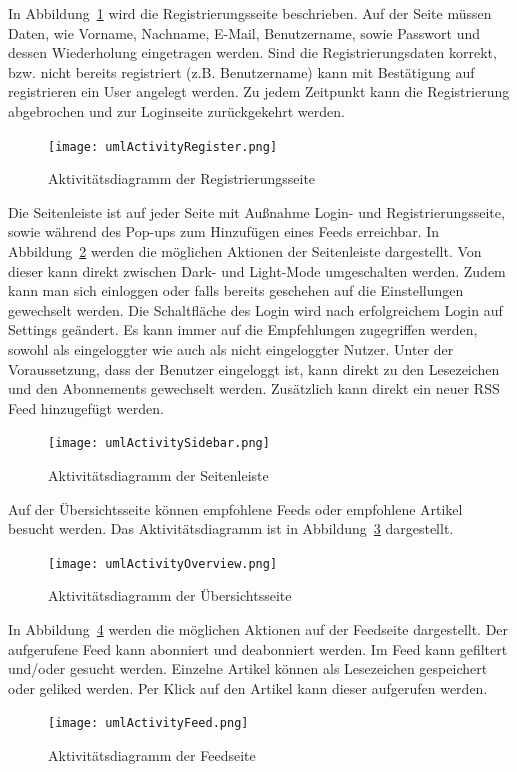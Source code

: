 In Abbildung~\ref{fig:umlActivityRegister.png} wird die Registrierungsseite beschrieben.
Auf der Seite müssen Daten, wie Vorname, Nachname, E-Mail, Benutzername, sowie Passwort und dessen Wiederholung eingetragen werden.
Sind die Registrierungsdaten korrekt, bzw. nicht bereits registriert (z.B. Benutzername) kann mit Bestätigung auf registrieren ein User angelegt werden.
Zu jedem Zeitpunkt kann die Registrierung abgebrochen und zur Loginseite zurückgekehrt werden.
\begin{figure}
    \texttt{[image: umlActivityRegister.png]}
    \caption{Aktivitätsdiagramm der Registrierungsseite}
    \label{fig:umlActivityRegister.png}
\end{figure}

Die Seitenleiste ist auf jeder Seite mit Außnahme Login- und Registrierungsseite, sowie während des Pop-ups zum Hinzufügen eines Feeds erreichbar.
In Abbildung~\ref{fig:umlActivitySidebar.png} werden die möglichen Aktionen der Seitenleiste dargestellt.
Von dieser kann direkt zwischen Dark- und Light-Mode umgeschalten werden. Zudem kann man sich einloggen
oder falls bereits geschehen auf die Einstellungen gewechselt werden. Die Schaltfläche des Login wird nach erfolgreichem Login auf Settings geändert.
Es kann immer auf die Empfehlungen zugegriffen werden, sowohl als eingeloggter wie auch als nicht eingeloggter Nutzer.
Unter der Voraussetzung, dass der Benutzer eingeloggt ist, kann direkt zu den Lesezeichen und den Abonnements gewechselt werden.
Zusätzlich kann direkt ein neuer RSS Feed hinzugefügt werden.
\begin{figure}
    \texttt{[image: umlActivitySidebar.png]}
    \caption{Aktivitätsdiagramm der Seitenleiste}
    \label{fig:umlActivitySidebar.png}
\end{figure}

Auf der Übersichtsseite können empfohlene Feeds oder empfohlene Artikel besucht werden.
Das Aktivitätsdiagramm ist in Abbildung~\ref{fig:umlActivityOverview.png} dargestellt.
\begin{figure}
    \texttt{[image: umlActivityOverview.png]}
    \caption{Aktivitätsdiagramm der Übersichtsseite}
    \label{fig:umlActivityOverview.png}
\end{figure}

In Abbildung~\ref{fig:umlActivityFeed.png} werden die möglichen Aktionen auf der Feedseite dargestellt.
Der aufgerufene Feed kann abonniert und deabonniert werden. Im Feed kann gefiltert und/oder gesucht werden.
Einzelne Artikel können als Lesezeichen gespeichert oder geliked werden. Per Klick auf den Artikel kann dieser aufgerufen werden.
\begin{figure}
    \texttt{[image: umlActivityFeed.png]}
    \caption{Aktivitätsdiagramm der Feedseite}
    \label{fig:umlActivityFeed.png}
\end{figure}

